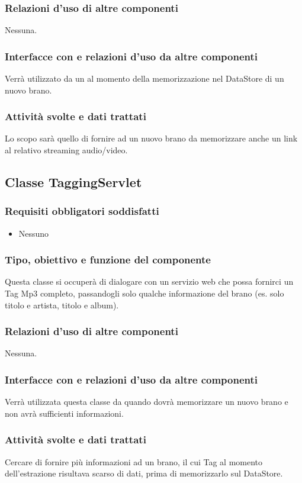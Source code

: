 \subsubsection*{Relazioni d'uso di altre componenti}
Nessuna.
\subsubsection*{Interfacce con e relazioni d'uso da altre componenti}
Verr\`a utilizzato da un  al momento della memorizzazione nel
DataStore di un nuovo brano.
\subsubsection*{Attivit\`a svolte e dati trattati}
Lo scopo sar\`a quello di fornire ad un nuovo brano
da memorizzare anche un link al relativo streaming audio/video.

\subsection{Classe TaggingServlet}
\subsubsection*{Requisiti obbligatori soddisfatti}
\begin{itemize}
    \item Nessuno
\end{itemize}
\subsubsection*{Tipo, obiettivo e funzione del componente}
Questa classe si occuper\`a di dialogare con un servizio web che possa fornirci
un Tag Mp3 completo, passandogli solo qualche informazione del brano (es.
solo titolo e artista, titolo e album).
\subsubsection*{Relazioni d'uso di altre componenti}
Nessuna.
\subsubsection*{Interfacce con e relazioni d'uso da altre componenti}
Verr\`a utilizzata questa classe da  quando dovr\`a memorizzare
un nuovo brano e non avr\`a sufficienti informazioni.
\subsubsection*{Attivit\`a svolte e dati trattati}
Cercare di fornire pi\`u informazioni ad un brano, il cui Tag al momento
dell'estrazione risultava scarso di dati, prima di memorizzarlo sul
DataStore.


